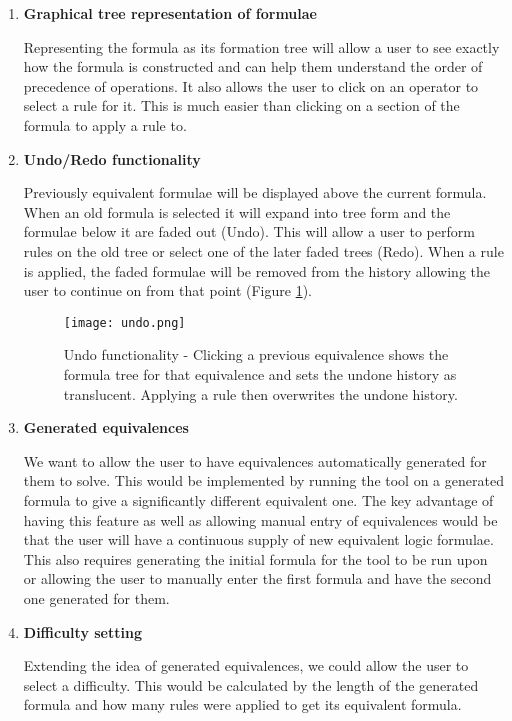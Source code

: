 \documentclass{report}
\begin{document}
\begin{enumerate}
\item \textbf{Graphical tree representation of formulae}

Representing the formula as its formation tree will allow a user to see exactly how the formula is constructed and can help them understand the order of precedence of operations. It also allows the user to click on an operator to select a rule for it. This is much easier than clicking on a section of the formula to apply a rule to.

\item \textbf{Undo/Redo functionality}

Previously equivalent formulae will be displayed above the current formula. When an old formula is selected it will expand into tree form and the formulae below it are faded out (Undo). This will allow a user to perform rules on the old tree or select one of the later faded trees (Redo). When a rule is applied, the faded formulae will be removed from the history allowing the user to continue on from that point (Figure \ref{undo}).

\begin{figure}[ht]
    \centering
    \texttt{[image: undo.png]}
    \caption{Undo functionality - Clicking a previous equivalence shows the formula tree for that equivalence and sets the undone history as translucent. Applying a rule then overwrites the undone history.}
    \label{undo}
\end{figure}

\item \textbf{Generated equivalences}

We want to allow the user to have equivalences automatically generated for them to solve. This would be implemented by running the tool on a generated formula to give a significantly different equivalent one. The key advantage of having this feature as well as allowing manual entry of equivalences would be that the user will have a continuous supply of new equivalent logic formulae. This also requires generating the initial formula for the tool to be run upon or allowing the user to manually enter the first formula and have the second one generated for them.

\item \textbf{Difficulty setting}

Extending the idea of generated equivalences, we could allow the user to select a difficulty. This would be calculated by the length of the generated formula and how many rules were applied to get its equivalent formula.


\end{enumerate}
\end{document}
